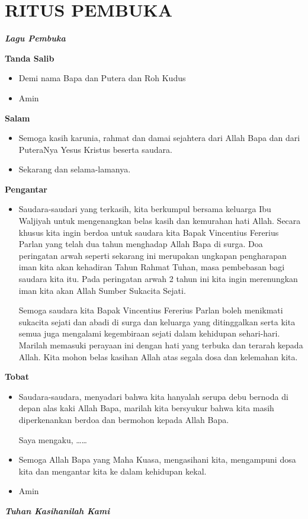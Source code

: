\documentclass[titlepage,10pt,openany]{scrbook}
\makeatletter
\newcommand{\subjudul}[1]{%
  {\parindent \z@ 
    \interlinepenalty\@M \bfseries #1\par\nobreak \vskip 10\p@ }}
\newcommand{\lagu}[1]{%
  {\parindent \z@ 
    \interlinepenalty\@M \slshape \bfseries \normalsize \textit{#1}\par\nobreak \vskip 10\p@ }}
\newcommand{\BU}[1]{\begin{itemize} \item[U:] #1 \end{itemize}}
\newcommand{\BI}[1]{\begin{itemize} \item[I:] #1 \end{itemize}}
\newcommand{\namaalm}{Bapak Vincentius Fererius Parlan }
\makeatother
\begin{document}
\section*{RITUS PEMBUKA} 

 

\lagu{Lagu Pembuka}  
 

\subjudul{Tanda Salib} 

\BI{Demi nama  Bapa dan Putera dan Roh Kudus}

\BU{Amin}

 

\subjudul{Salam}

\BI{Semoga kasih karunia, rahmat dan damai sejahtera dari 
Allah Bapa dan dari PuteraNya Yesus Kristus beserta 
saudara.} 

\BU{Sekarang dan selama-lamanya.}

 

\subjudul{Pengantar}

\BI{Saudara-saudari yang terkasih, kita berkumpul bersama keluarga Ibu Waljiyah untuk mengenangkan belas kasih dan kemurahan hati Allah. Secara khusus kita ingin berdoa untuk saudara kita \namaalm yang telah dua tahun menghadap Allah Bapa di surga. Doa peringatan arwah seperti sekarang ini merupakan ungkapan pengharapan iman kita akan kehadiran Tahun Rahmat Tuhan, masa pembebasan bagi saudara kita itu. Pada peringatan arwah 2 tahun ini kita ingin merenungkan iman kita akan Allah Sumber Sukacita Sejati.

Semoga saudara kita \namaalm boleh menikmati sukacita sejati dan abadi di surga dan keluarga yang ditinggalkan serta kita semua juga mengalami kegembiraan sejati dalam kehidupan sehari-hari. Marilah memasuki perayaan ini dengan hati yang terbuka dan terarah kepada Allah. Kita mohon belas kasihan Allah atas segala dosa dan kelemahan kita.}


\subjudul{Tobat}

\BI{Saudara-saudara, menyadari bahwa kita hanyalah serupa 
debu bernoda di depan alas kaki Allah Bapa, marilah kita 
bersyukur bahwa kita masih diperkenankan berdoa dan 
bermohon kepada Allah Bapa. 

Saya mengaku, \ldots \ldots
} 



\BI{Semoga Allah Bapa yang Maha Kuasa, mengasihani kita, 
mengampuni dosa kita dan mengantar kita ke dalam 
kehidupan kekal.}

\BU{Amin}

\lagu{Tuhan Kasihanilah Kami} 
\end{document}

